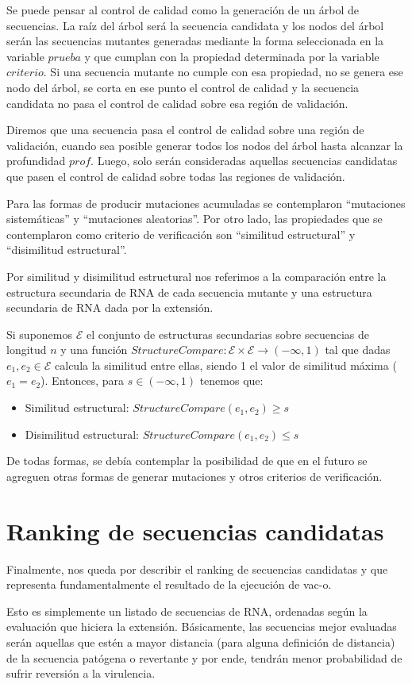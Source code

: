 Se puede pensar al control de calidad como la generaci\'on de un \'arbol de
secuencias. La ra\'iz del \'arbol ser\'a la secuencia candidata y los nodos del
\'arbol ser\'an las secuencias mutantes generadas mediante la forma seleccionada
en la variable $prueba$ y que cumplan con la propiedad determinada por la
variable $criterio$. Si una secuencia mutante no cumple con esa propiedad, no se
genera ese nodo del \'arbol, se corta en ese punto el control de calidad y la
secuencia candidata no pasa el control de calidad sobre esa regi\'on de
validaci\'on.

Diremos que una secuencia pasa el control de calidad sobre una regi\'on de
validaci\'on, cuando sea posible generar todos los nodos del \'arbol hasta
alcanzar la profundidad $prof$. Luego, solo ser\'an consideradas aquellas
secuencias candidatas que pasen el control de calidad sobre todas las regiones
de validaci\'on.

Para las formas de producir mutaciones acumuladas se contemplaron ``mutaciones
sistem\'aticas'' y ``mutaciones aleatorias''. Por otro lado, las propiedades
que se contemplaron como criterio de verificaci\'on son ``similitud
estructural'' y ``disimilitud estructural''.

Por similitud y disimilitud estructural nos referimos a la comparaci\'on entre
la estructura secundaria de \ac{RNA} de cada secuencia mutante y una estructura
secundaria de \ac{RNA} dada por la extensi\'on. 

Si suponemos $\mathcal{E}$ el conjunto de estructuras secundarias sobre
secuencias de longitud $n$ y una funci\'on $StructureCompare : \mathcal{E}
\times \mathcal{E} \rightarrow (-\infty, 1)$ tal que dadas $e_{1},e_{2} \in
\mathcal{E}$ calcula la similitud entre ellas, siendo 1 el valor de similitud
m\'axima ($e_{1} = e_{2}$). Entonces, para $s \in (-\infty, 1)$ tenemos que:
\begin{itemize}
 \item Similitud estructural: $StructureCompare(e_{1}, e_{2}) \ge s$
 \item Disimilitud estructural: $StructureCompare(e_{1}, e_{2}) \le s$
\end{itemize}

De todas formas, se deb\'ia contemplar la posibilidad de que en el
futuro se agreguen otras formas de generar mutaciones y otros criterios de
verificaci\'on.

\section{Ranking de secuencias candidatas}

Finalmente, nos queda por describir el ranking de secuencias candidatas y que
representa fundamentalmente el resultado de la ejecuci\'on de \ac{vac-o}.

Esto es simplemente un listado de secuencias de \ac{RNA}, ordenadas seg\'un la
evaluaci\'on que hiciera la extensi\'on. B\'asicamente, las secuencias mejor
evaluadas ser\'an aquellas que est\'en a mayor distancia (para alguna
definici\'on de distancia) de la secuencia pat\'ogena o revertante y por ende,
tendr\'an menor probabilidad de sufrir reversi\'on a la virulencia.